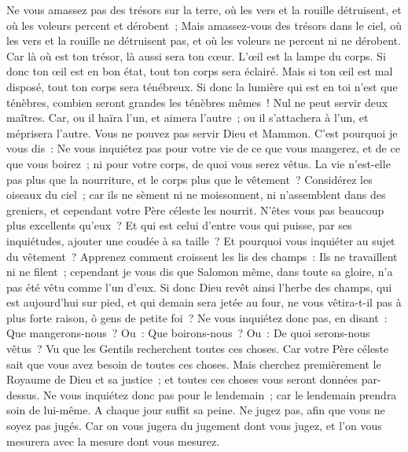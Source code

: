 \begin{multicols}{2}
Ne vous amassez pas des trésors sur la terre, où les vers et la rouille détruisent, et où les voleurs percent et dérobent~;
Mais amassez-vous des trésors dans le ciel, où les vers et la rouille ne détruisent pas, et où les voleurs ne percent ni ne dérobent.
Car là où est ton trésor, là aussi sera ton cœur.
L'œil est la lampe du corps. Si donc ton œil est en bon état, tout ton corps sera éclairé.
Mais si ton œil est mal disposé, tout ton corps sera ténébreux. Si donc la lumière qui est en toi n'est que ténèbres, combien seront grandes les ténèbres mêmes~!
Nul ne peut servir deux maîtres. Car, ou il haïra l'un, et aimera l'autre~; ou il s'attachera à l'un, et méprisera l'autre. Vous ne pouvez pas servir Dieu et Mammon.
C'est pourquoi je vous dis~: Ne vous inquiétez pas pour votre vie de ce que vous mangerez, et de ce que vous boirez~; ni pour votre corps, de quoi vous serez vêtus. La vie n'est-elle pas plus que la nourriture, et le corps plus que le vêtement~?
Considérez les oiseaux du ciel~; car ils ne sèment ni ne moissonnent, ni n'assemblent dans des greniers, et cependant votre Père céleste les nourrit. N'êtes vous pas beaucoup plus excellents qu'eux~?
Et qui est celui d'entre vous qui puisse, par ses inquiétudes, ajouter une coudée à sa taille~?
Et pourquoi vous inquiéter au sujet du vêtement~? Apprenez comment croissent les lis des champs~: Ils ne travaillent ni ne filent~;
cependant je vous dis que Salomon même, dans toute sa gloire, n'a pas été vêtu comme l'un d'eux.
Si donc Dieu revêt ainsi l'herbe des champs, qui est aujourd'hui sur pied, et qui demain sera jetée au four, ne vous vêtira-t-il pas à plus forte raison, ô gens de petite foi~?
Ne vous inquiétez donc pas, en disant~: Que mangerons-nous~? Ou~: Que boirons-nous~? Ou~: De quoi serons-nous vêtus~?
Vu que les Gentils recherchent toutes ces choses. Car votre Père céleste sait que vous avez besoin de toutes ces choses.
Mais cherchez premièrement le Royaume de Dieu et sa justice~; et toutes ces choses vous seront données par-dessus.
Ne vous inquiétez donc pas pour le lendemain~; car le lendemain prendra soin de lui-même. A chaque jour suffit sa peine.
\VerseOne{}Ne jugez pas, afin que vous ne soyez pas jugés.
Car on vous jugera du jugement dont vous jugez, et l'on vous mesurera avec la mesure dont vous mesurez.

\end{multicols}
